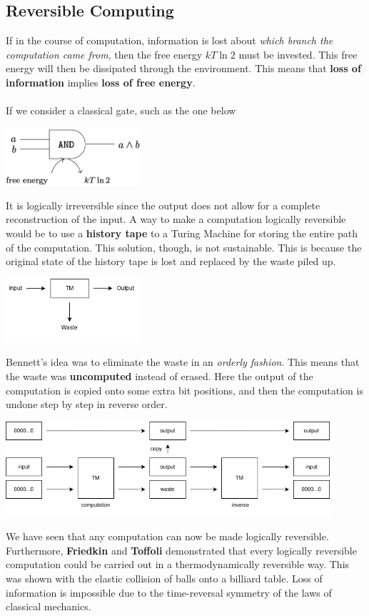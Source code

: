 \documentclass{article}
\begin{document}
\subsection{Reversible Computing}
If in the course of computation, information is lost about \textit{which branch the computation came from}, then the free energy $kT \ln 2$ must be invested. This free energy will then be dissipated through the environment. This means that \textbf{loss of information} implies \textbf{loss of free energy}. \\ \\
If we consider a classical gate, such as the one below

\begin{center}
	\includegraphics[width=5cm]{assets/and.png}
\end{center}
It is logically irreversible since the output does not allow for a complete reconstruction of the input. A way to make a computation logically reversible would be to use a \textbf{history tape} to a Turing Machine for storing the entire path of the computation. This solution, though, is not sustainable. This is because the original state of the history tape is lost and replaced by the waste piled up.

\begin{center}
	\includegraphics[width=5cm]{assets/irreversible_tm.png}
\end{center}
Bennett's idea was to eliminate the waste in an \textit{orderly fashion}. This means that the waste was \textbf{uncomputed} instead of erased. Here the output of the computation is copied onto some extra bit positions, and then the computation is undone step by step in reverse order.

\begin{center}
	\includegraphics[width=12cm]{assets/reversible_tm.png}
\end{center}
We have seen that any computation can now be made logically reversible. Furthermore, \textbf{Friedkin} and \textbf{Toffoli} demonstrated that every logically reversible computation could be carried out in a thermodynamically reversible way. This was shown with the elastic collision of balls onto a billiard table. Loss of information is impossible due to the time-reversal symmetry of the laws of classical mechanics.
\end{document}
